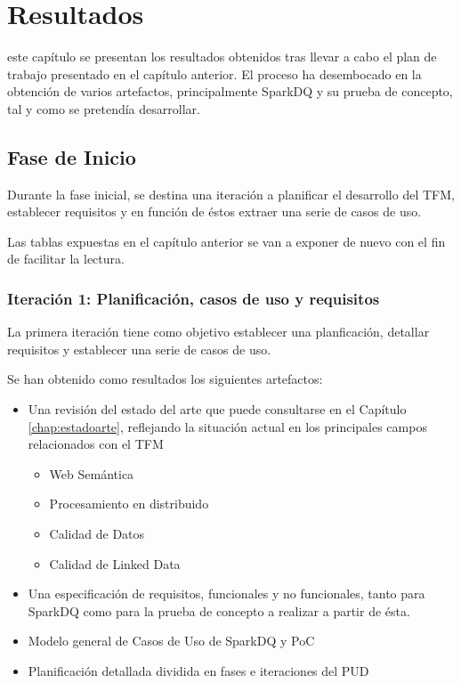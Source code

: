 \chapter{Resultados}
\label{chap:resultados}

 este capítulo se presentan los resultados obtenidos tras llevar a
cabo el plan de trabajo presentado en el capítulo anterior. El proceso ha
desembocado en la obtención de varios artefactos, principalmente SparkDQ y su
prueba de concepto, tal y como se pretendía desarrollar.

\section{Fase de Inicio}

Durante la fase inicial, se destina una iteración a planificar el desarrollo del
\acs{TFM}, establecer requisitos y en función de éstos extraer una serie de
casos de uso.

Las tablas expuestas en el capítulo anterior se van a exponer de nuevo con el
fin de facilitar la lectura.

\subsection{Iteración 1: Planificación, casos de uso y requisitos}

La primera iteración tiene como objetivo establecer una planficación, detallar
requisitos y establecer una serie de casos de uso.

Se han obtenido como resultados los siguientes artefactos:

\begin{itemize}
\item Una revisión del estado del arte que puede consultarse en el Capítulo
  \ref{chap:estadoarte}, reflejando la situación actual en los principales
  campos relacionados con el \acs{TFM}
  \begin{itemize}
  \item Web Semántica
  \item Procesamiento en distribuido
  \item Calidad de Datos
  \item Calidad de Linked Data
  \end{itemize}

\item Una especificación de requisitos, funcionales y no funcionales, tanto para
  SparkDQ como para la prueba de concepto a realizar a partir de ésta.
\item Modelo general de Casos de Uso de SparkDQ y PoC
\item Planificación detallada dividida en fases e iteraciones del \acs{PUD}
\end{itemize}

